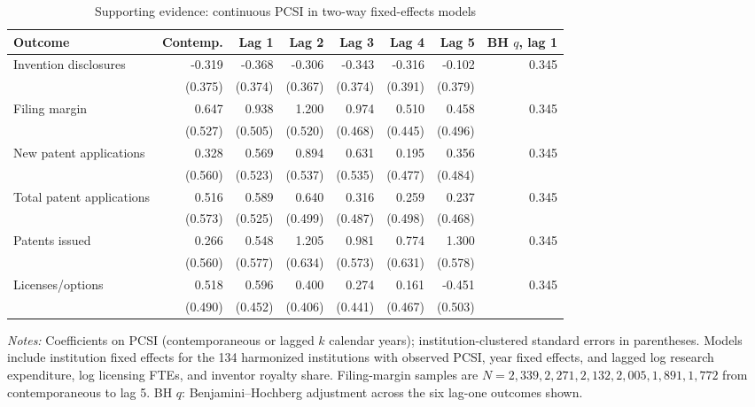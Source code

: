 \begin{table}[htbp]\centering
\caption{Supporting evidence: continuous PCSI in two-way fixed-effects models}\label{tab:twfe}
\begin{threeparttable}\footnotesize\setlength{\tabcolsep}{3pt}\begin{tabular}{lrrrrrrr}\toprule
Outcome & Contemp. & Lag 1 & Lag 2 & Lag 3 & Lag 4 & Lag 5 & BH $q$, lag 1 \\\midrule
Invention disclosures & -0.319 & -0.368 & -0.306 & -0.343 & -0.316 & -0.102 & 0.345 \\
 & (0.375) & (0.374) & (0.367) & (0.374) & (0.391) & (0.379) & \\
Filing margin & 0.647 & 0.938 & 1.200 & 0.974 & 0.510 & 0.458 & 0.345 \\
 & (0.527) & (0.505) & (0.520) & (0.468) & (0.445) & (0.496) & \\
New patent applications & 0.328 & 0.569 & 0.894 & 0.631 & 0.195 & 0.356 & 0.345 \\
 & (0.560) & (0.523) & (0.537) & (0.535) & (0.477) & (0.484) & \\
Total patent applications & 0.516 & 0.589 & 0.640 & 0.316 & 0.259 & 0.237 & 0.345 \\
 & (0.573) & (0.525) & (0.499) & (0.487) & (0.498) & (0.468) & \\
Patents issued & 0.266 & 0.548 & 1.205 & 0.981 & 0.774 & 1.300 & 0.345 \\
 & (0.560) & (0.577) & (0.634) & (0.573) & (0.631) & (0.578) & \\
Licenses/options & 0.518 & 0.596 & 0.400 & 0.274 & 0.161 & -0.451 & 0.345 \\
 & (0.490) & (0.452) & (0.406) & (0.441) & (0.467) & (0.503) & \\
\bottomrule\end{tabular}
\begin{tablenotes}[flushleft]\footnotesize
\item \textit{Notes:} Coefficients on PCSI (contemporaneous or lagged $k$ calendar years); institution-clustered standard errors in parentheses. Models include institution fixed effects for the 134 harmonized institutions with observed PCSI, year fixed effects, and lagged log research expenditure, log licensing FTEs, and inventor royalty share. Filing-margin samples are $N=2,339, 2,271, 2,132, 2,005, 1,891, 1,772$ from contemporaneous to lag 5. BH $q$: Benjamini--Hochberg adjustment across the six lag-one outcomes shown.
\end{tablenotes}\end{threeparttable}\end{table}
